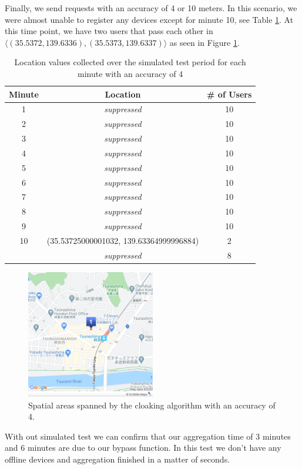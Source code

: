Finally, we send requests with an accuracy of 4 or 10 meters. In this scenario, we were almost unable to register any devices except for minute 10, see Table \ref{tab:location_sim4}. At this time point, we have two users that pass each other in \(\langle(35.5372, 139.6336),(35.5373, 139.6337)\rangle\) as seen in Figure \ref{fig:acc4}.

\begin{table}[htbp]
    \centering
    \begin{tabular}{|c|c|c|} 
        \hline
        \textbf{Minute} & \textbf{Location} & \textbf{\# of Users}\\ [0.5ex] 
        \hline
        1 & \textit{suppressed} & 10 \\
        \hline
        2 &\textit{suppressed} & 10 \\
        \hline
        3 &\textit{suppressed} & 10 \\
        \hline
        4 &\textit{suppressed} & 10 \\
        \hline
        5 &\textit{suppressed} & 10 \\
        \hline
        6 &\textit{suppressed} & 10 \\
        \hline
        7 &\textit{suppressed} & 10 \\
        \hline
        8 &\textit{suppressed} & 10 \\
        \hline
        9 &\textit{suppressed} & 10 \\
        \hline
        10 & (35.53725000001032, 139.63364999996884) & 2 \\ 
        &\textit{suppressed} & 8 \\ 
        \hline
    \end{tabular}
    \caption{Location values collected over the simulated test period for each minute with an accuracy of 4}
    \label{tab:location_sim4}
\end{table}

\begin{figure}[htbp]
  \centering
  \includegraphics[width=0.5\textwidth]{figures/acc4}
  \caption{Spatial areas spanned by the cloaking algorithm with an accuracy of 4.} \label{fig:acc4}
\end{figure}
With out simulated test we can confirm that our aggregation time of 3 minutes and 6 minutes are due to our bypass function. In this test we don't have any offline devices and aggregation finished in a matter of seconds.

